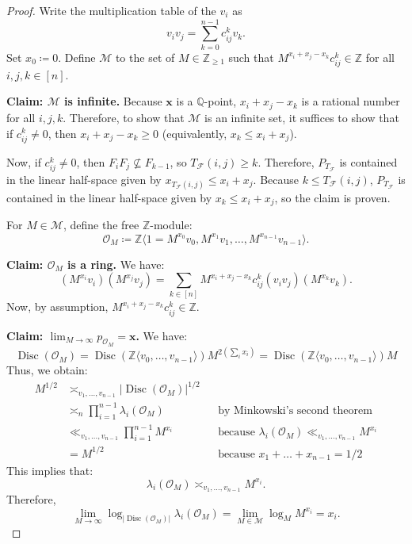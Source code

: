\documentclass[letterpaper,10pt]{amsart}
\DeclareMathOperator{\Disc}{Disc}
\newcommand{\ZZ}{\mathbb{Z}}      %
\newcommand{\QQ}{\mathbb{Q}}      %
\newcommand{\cO}{\mathcal{O}}      %
\newcommand{\la}{\langle}
\newcommand{\ra}{\rangle}
\newcommand{\cF}{\mathcal{F}}
\newcommand{\cM}{\mathcal{M}}
\theoremstyle{definition}
\theoremstyle{remark}
\begin{document}
\begin{proof}
Write the multiplication table of the $v_{i}$ as
\[
    v_iv_j = \sum_{k = 0}^{n-1}c_{ij}^k v_k.
\]
Set $x_0 \coloneqq 0$. Define $\cM$ to the set of $M \in \ZZ_{\geq 1}$ such that $M^{x_i + x_j - x_k}c_{ij}^k \in \ZZ$ for all $i,j,k \in [n]$.

\noindent \textbf{Claim: $\cM$ is infinite.}
Because $\mathbf{x}$ is a $\QQ$-point, $x_i + x_j - x_k$ is a rational number for all $i,j,k$. Therefore, to show that $\cM$ is an infinite set, it suffices to show that if $c_{ij}^k \neq 0$, then $x_i + x_j - x_k \geq 0$ (equivalently, $x_k \leq x_i + x_j$). 

Now, if $c_{ij}^k \neq 0$, then $F_i F_j \not \subseteq F_{k-1}$, so $T_{\cF}(i,j) \geq k$. Therefore, $P_{T_{\cF}}$ is contained in the linear half-space given by $x_{T_{\cF}(i,j)} \leq x_i + x_j$. Because $k \leq T_{\cF}(i,j)$, $P_{T_{\cF}}$ is contained in the linear half-space given by $x_k \leq x_i + x_j$, so the claim is proven. 

For $M \in \cM$, define the free $\ZZ$-module:
\[
	\cO_M \coloneqq \ZZ \la 1 = M^{x_0}v_0, M^{x_1}v_1,\dots, M^{x_{n-1}} v_{n-1} \ra.
\]

\noindent \textbf{Claim: $\cO_M$ is a ring.} 
We have:
\[
	(M^{x_i}v_i)(M^{x_j}v_j) = \sum_{k \in [n]} M^{x_i + x_j - x_k}c_{ij}^k(v_iv_j) (M^{x_k}v_k).
\]
Now, by assumption, $M^{x_i + x_j - x_k}c_{ij}^k \in \ZZ$.

\noindent \textbf{Claim: $\lim_{M \rightarrow \infty}p_{\cO_M} = \mathbf{x}$.}
We have:
\[
    \Disc(\cO_M) = \Disc(\ZZ\langle v_0,\dots,v_{n-1}\rangle)M^{2(\sum_{i}x_i)} = \Disc(\ZZ\langle v_0,\dots,v_{n-1}\rangle)M
\]
Thus, we obtain:
\begin{align*}
M^{1/2} &\asymp_{v_1,\dots,v_{n-1}} \lvert \Disc(\cO_M) \rvert^{1/2} &&  \\
&\asymp_n \prod_{i = 1}^{n-1} \lambda_i(\cO_M) && \text{by Minkowski's second theorem} \\
&\ll_{v_1,\dots,v_{n-1}} \prod_{i = 1}^{n-1} M^{x_i} && \text{because } \lambda_i(\cO_M) \ll_{v_1,\dots,v_{n-1}} M^{x_i} \\
&= M^{1/2} && \text{because } x_1 + \dots + x_{n-1} = 1/2
\end{align*}
This implies that:
\[
	\lambda_i(\cO_M) \asymp_{v_1,\dots,v_{n-1}} M^{x_i}.
\]
Therefore,
\[
	\lim_{M \rightarrow \infty}\log_{\lvert \Disc(\cO_M) \rvert}\lambda_i(\cO_M) = \lim_{M \in \cM}\log_{M}M^{x_i} = x_i.
\]
\end{proof}
\end{document}

